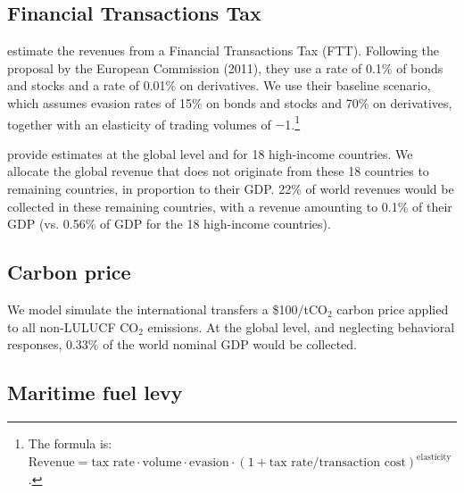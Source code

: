 \documentclass[12pt,english]{article}
\begin{document}
\begin{bibunit}
\subsection{Financial Transactions Tax}\label{sec:ftt}

\cite{pekanov_global_2019} estimate the revenues from a Financial Transactions Tax (FTT). Following the proposal by the European Commission (2011), they use a rate of 0.1\% of bonds and stocks and a rate of 0.01\% on derivatives. We use their baseline scenario, which assumes evasion rates of 15\% on bonds and stocks and 70\% on derivatives, together with an elasticity of trading volumes of $-$1.\footnote{The formula is: $\text{Revenue} = \text{tax rate} \cdot \text{volume} \cdot \text{evasion} \cdot \left(1 + \text{tax rate} / \text{transaction cost}\right)^\text{elasticity}$.} 

\cite{pekanov_global_2019} provide estimates at the global level and for 18 high-income countries. We allocate the global revenue that does not originate from these 18 countries to remaining countries, in proportion to their GDP. 22\% of world revenues would be collected in these remaining countries, with a revenue amounting to 0.1\% of their GDP (vs. 0.56\% of GDP for the 18 high-income countries).


\subsection{Carbon price}\label{sec:carbon}

We model simulate the international transfers a \$100/tCO$_\text{2}$ carbon price applied to all non-LULUCF CO$_\text{2}$ emissions. At the global level, and neglecting behavioral responses, 0.33\% of the world nominal GDP would be collected. 

\subsection{Maritime fuel levy}\label{sec:wealth}


\end{bibunit}
\end{document}
